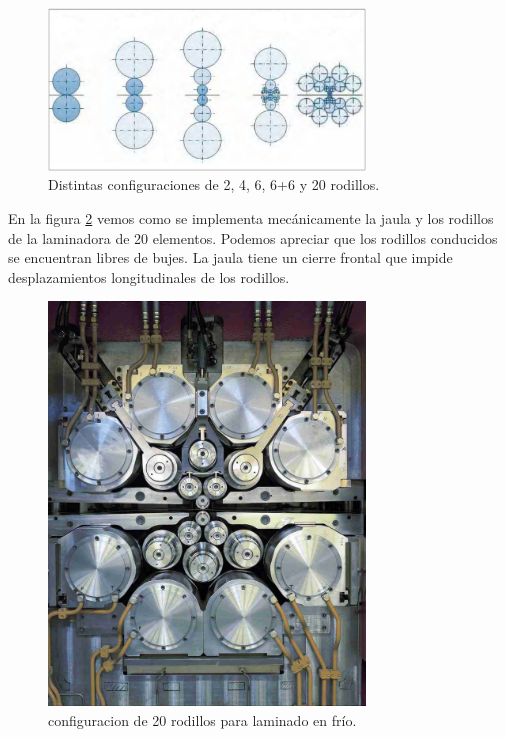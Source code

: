 \begin{figure}[h]
	\centering
	\includegraphics[width=0.75\textwidth]{./Figures/rodillos.jpg}
	\caption{Distintas configuraciones de 2, 4, 6, 6+6 y 20 rodillos\protect\footnotemark.}
	\label{fig:rodillosLaminadoFrio} 
\end{figure}

En la figura \ref{fig:rodillosLaminadoFrio20} vemos como se implementa mecánicamente la jaula y los rodillos de la laminadora de 20 elementos. Podemos apreciar que los rodillos conducidos se encuentran libres de bujes. La jaula tiene un cierre frontal que impide  desplazamientos longitudinales de los rodillos. 

\begin{figure}[h]
	\centering
	\includegraphics[width=0.75\textwidth]{./Figures/multicilindros1a.jpg}
	\caption{configuracion de 20 rodillos para laminado en frío\protect\footnotemark.}
	\label{fig:rodillosLaminadoFrio20} 
\end{figure}

